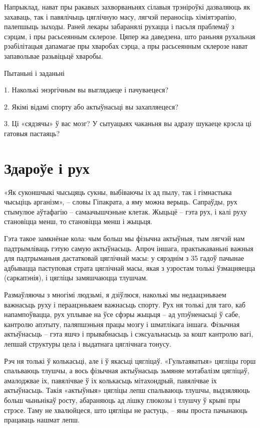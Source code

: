 Напрыклад, нават пры ракавых захворваньнях сілавыя трэніроўкі дазваляюць як захаваць, так і павялічыць цяглічную масу, лягчэй пераносіць хіміятэрапію, палепшыць зыходы. Раней лекары забаранялі рухацца і пасьля праблемаў з сэрцам, і пры расьсеянным склерозе. Цяпер жа даведзена, што раньняя рухальная рэабілітацыя дапамагае пры хваробах сэрца, а пры расьсеянным склерозе нават запавольвае разьвіцьцё хваробы.

Пытаньні і заданьні

1. Наколькі энэргічным вы выглядаеце і пачуваецеся?

2. Якімі відамі спорту або актыўнасьці вы захапляецеся?

3. Ці «сядзячы» ў вас мозг? У сытуацыях чаканьня вы адразу шукаеце крэсла ці гатовыя пастаяць?


\section{Здароўе і рух}

«Як суконшчыкі чысьцяць сукны, выбіваючы іх ад пылу, так і гімнастыка чысьціць арганізм», – словы Гіпакрата, а яму можна верыць. Сапраўды, рух стымулюе аўтафагію – самаачышчэньне клетак. Жыцьцё – гэта рух, і калі руху становіцца менш, то становіцца менш і жыцьця.

Гэта такое замкнёнае кола: чым больш мы фізычна актыўныя, тым лягчэй нам падтрымліваць гэтую самую актыўнасьць. Апроч іншага, практыкаваньні важныя для падтрыманьня дастатковай цяглічнай масы: у сярэднім з 35 гадоў пачынае адбывацца паступовая страта цяглічнай масы, якая з узростам толькі ўзмацняецца (саркапэнія), і цягліцы замяшчаюцца тлушчам.

Размаўляючы з многімі людзьмі, я дзіўлюся, наколькі мы недаацэньваем важнасьць руху і пераацэньваем важнасьць спорту. Рух ня толькі для таго, каб напампоўвацца, рух уплывае на ўсе сфэры жыцьця – ад упэўненасьці ў сабе, кантролю апэтыту, паляпшэньня працы мозгу і шматлікага іншага. Фізычная актыўнасьць – гэта яшчэ і прывабнасьць і сэксуальнасьць за кошт кантролю вагі, лепшай структуры цела і выдатнага цяглічнага тонусу.

Рэч ня толькі ў колькасьці, але і ў якасьці цягліцаў. «Гультаяватыя» цягліцы горш спальваюць тлушчы, а вось фізычная актыўнасьць зьмяняе мэтабалізм цягліцаў, амалоджвае іх, павялічвае ў іх колькасьць мітахондрый, павялічвае іх актыўнасьць. Такія «актыўныя» цягліцы лепш спальваюць тлушчы, выдзяляюць больш чыньнікаў росту, абараняюць ад лішку глюкозы і тлушчу ў крыві пры стрэсе. Таму не хвалюйцеся, што цягліцы не растуць, – яны проста пачынаюць працаваць нашмат лепш.

